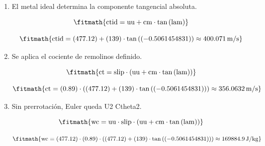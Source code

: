 \begin{enumerate}

\item El metal ideal determina la componente tangencial absoluta.

\[\fitmath{\mathrm{ctid}=\mathrm{uu}+\mathrm{cm}\cdot \tan\left(\mathrm{lam}\right)}\]

\[\fitmath{\mathrm{ctid}=(477.12)+(139)\cdot \tan\left((-0.5061454831)\right)\approx 400.071\,\mathrm{m/s}}\]

\item Se aplica el cociente de remolinos definido.

\[\fitmath{\mathrm{ct}=\mathrm{slip}\cdot \left(\mathrm{uu}+\mathrm{cm}\cdot \tan\left(\mathrm{lam}\right)\right)}\]

\[\fitmath{\mathrm{ct}=(0.89)\cdot \left((477.12)+(139)\cdot \tan\left((-0.5061454831)\right)\right)\approx 356.0632\,\mathrm{m/s}}\]

\item Sin prerrotación, Euler queda U2 Ctheta2.

\[\fitmath{\mathrm{wc}=\mathrm{uu}\cdot \mathrm{slip}\cdot \left(\mathrm{uu}+\mathrm{cm}\cdot \tan\left(\mathrm{lam}\right)\right)}\]

\[\fitmath{\mathrm{wc}=(477.12)\cdot (0.89)\cdot \left((477.12)+(139)\cdot \tan\left((-0.5061454831)\right)\right)\approx 169884.9\,\mathrm{J/kg}}\]

\end{enumerate}
